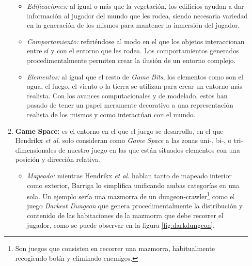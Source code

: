 \begin{enumerate}[label=(\alph*)]
\begin{itemize}
        \item \textit{Edificaciones:} al igual o más que la vegetación, los edificios ayudan a dar información al jugador del mundo que les rodea, siendo necesaria variedad en la generación de los mismos para mantener la inmersión del jugador.
        \item \textit{Comportamiento:} refiriéndose al modo en el que los objetos interaccionan entre sí y con el entorno que les rodea. Los comportamientos generados procedimentalmente permiten crear la ilusión de un entorno complejo.
        \item \textit{Elementos:} al igual que el resto de \textit{Game Bits}, los elementos como son el agua, el fuego, el viento o la tierra se utilizan para crear un entorno más realista. Con los avances computacionales y de modelado, estos han pasado de tener un papel meramente decorativo a una representación realista de los mismos y como interactúan con el mundo.
    \end{itemize}
    
    \item \textbf{Game Space:} es el entorno en el que el juego se desarrolla, en el que Hendrikx \textit{et al.} \cite{hendrikx2013} solo consideran como \textit{Game Space} a las zonas uni-, bi-, o tri-dimensionales de nuestro juego en las que están situados elementos con una posición y dirección relativa.
    
    \begin{itemize}
        \item \textit{Mapeado:} mientras Hendrikx \textit{et al.} \cite{hendrikx2013} hablan tanto de mapeado interior como exterior, Barriga \cite{barriga2019} lo simplifica unificando ambas categorías en una sola. Un ejemplo sería una mazmorra de un dungeon-crawler\footnote{Son juegos que consisten en recorrer una mazmorra, habitualmente recogiendo botín y eliminado enemigos.} como el juego \textit{Darkest Dungeon} que genera procedimentalmente la distribución y contenido de las habitaciones de la mazmorra que debe recorrer el jugador, como se puede observar en la figura \ref{fig:darkdungeon}.
        

\end{itemize}
\end{enumerate}
